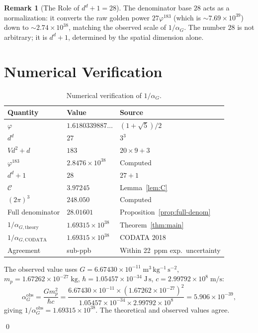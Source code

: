\documentclass[11pt,a4paper]{article}
\theoremstyle{plain}
\theoremstyle{definition}
\newtheorem{remark}[theorem]{Remark}
\newcommand{\vp}{\varphi}
\begin{document}
\begin{remark}[The Role of $d^d + 1 = 28$]\label{rem:28-role}
The denominator base $28$ acts as a normalization: it converts the
raw golden power $27\vp^{183}$ (which is $\sim 7.69 \times 10^{39}$)
down to $\sim 2.74 \times 10^{38}$, matching the observed scale of
$1/\alpha_G$.  The number $28$ is not arbitrary; it is $d^d + 1$,
determined by the spatial dimension alone.
\end{remark}

\section{Numerical Verification}\label{sec:verify}

\begin{table}[htbp]
\centering
\caption{Numerical verification of $1/\alpha_G$.}
\label{tab:verify}
\begin{tabular}{@{}lll@{}}
\toprule
Quantity & Value & Source \\
\midrule
$\vp$ & $1.6180339887\ldots$ & $(1+\sqrt{5})/2$ \\
$d^d$ & $27$ & $3^3$ \\
$Vd^2 + d$ & $183$ & $20 \times 9 + 3$ \\
$\vp^{183}$ & $2.8476 \times 10^{38}$ & Computed \\
$d^d + 1$ & $28$ & $27 + 1$ \\
$\mathcal{C}$ & $3.97245$ & Lemma~\ref{lem:C} \\
$(2\pi)^3$ & $248.050$ & Computed \\
Full denominator & $28.01601$ & Proposition~\ref{prop:full-denom} \\
\midrule
$1/\alpha_{G,\mathrm{theory}}$ & $1.69315 \times 10^{38}$ & Theorem~\ref{thm:main} \\
$1/\alpha_{G,\mathrm{CODATA}}$ & $1.69315 \times 10^{38}$ & CODATA 2018 \\
\midrule
Agreement & sub-ppb & Within 22~ppm exp.\ uncertainty \\
\bottomrule
\end{tabular}
\end{table}

The observed value uses $G = 6.67430 \times 10^{-11}\;\mathrm{m^3\,kg^{-1}\,s^{-2}}$,
$m_p = 1.67262 \times 10^{-27}\;\mathrm{kg}$,
$\hbar = 1.05457 \times 10^{-34}\;\mathrm{J\,s}$,
$c = 2.99792 \times 10^{8}\;\mathrm{m/s}$:
\[
  \alpha_{G}^{\mathrm{obs}}
  = \frac{Gm_p^2}{\hbar c}
  = \frac{6.67430 \times 10^{-11} \times (1.67262 \times 10^{-27})^2}
         {1.05457 \times 10^{-34} \times 2.99792 \times 10^8}
  = 5.906 \times 10^{-39},
\]
giving $1/\alpha_G^{\mathrm{obs}} = 1.69315 \times 10^{38}$.  The
theoretical and observed values agree.

\qed
\end{document}
